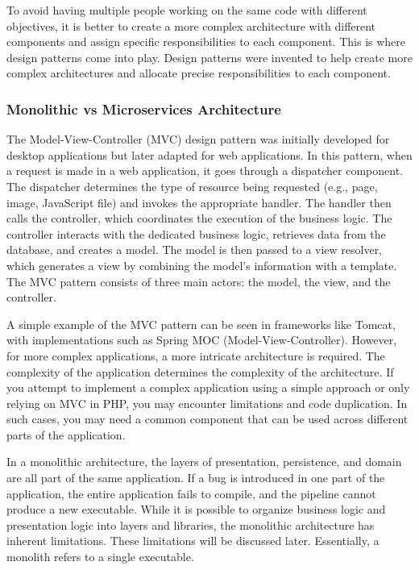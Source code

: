 To avoid having multiple people working on the same code with different
objectives, it is better to create a more complex architecture with
different components and assign specific responsibilities to each
component. This is where design patterns come into play. Design patterns
were invented to help create more complex architectures and allocate
precise responsibilities to each component.

\subsubsection{Monolithic vs Microservices Architecture}

The Model-View-Controller (MVC) design pattern was initially developed
for desktop applications but later adapted for web applications. In this
pattern, when a request is made in a web application, it goes through a
dispatcher component. The dispatcher determines the type of resource
being requested (e.g., page, image, JavaScript file) and invokes the
appropriate handler. The handler then calls the controller, which
coordinates the execution of the business logic. The controller
interacts with the dedicated business logic, retrieves data from the
database, and creates a model. The model is then passed to a view
resolver, which generates a view by combining the model's information
with a template. The MVC pattern consists of three main actors: the
model, the view, and the controller.

A simple example of the MVC pattern can be seen in frameworks like
Tomcat, with implementations such as Spring MOC (Model-View-Controller).
However, for more complex applications, a more intricate architecture is
required. The complexity of the application determines the complexity of
the architecture. If you attempt to implement a complex application
using a simple approach or only relying on MVC in PHP, you may encounter
limitations and code duplication. In such cases, you may need a common
component that can be used across different parts of the application.

In a monolithic architecture, the layers of presentation, persistence,
and domain are all part of the same application. If a bug is introduced
in one part of the application, the entire application fails to compile,
and the pipeline cannot produce a new executable. While it is possible
to organize business logic and presentation logic into layers and
libraries, the monolithic architecture has inherent limitations. These
limitations will be discussed later. Essentially, a monolith refers to a
single executable.


